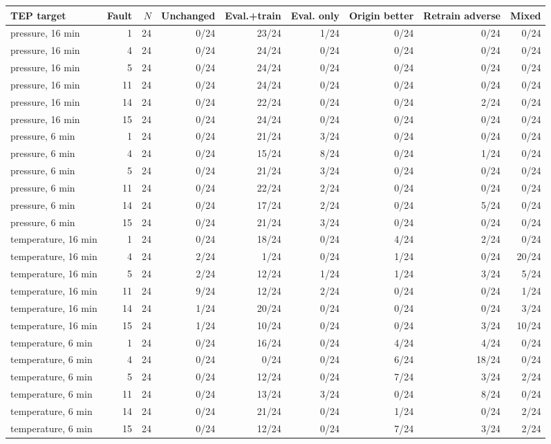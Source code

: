 \begin{tabular}{@{}lrrrrrrrr@{}}
\toprule
TEP target & Fault & $N$ & Unchanged & Eval.+train & Eval. only & Origin better & Retrain adverse & Mixed \\
\midrule
pressure, 16 min & 1 & 24 & 0/24 & 23/24 & 1/24 & 0/24 & 0/24 & 0/24 \\
pressure, 16 min & 4 & 24 & 0/24 & 24/24 & 0/24 & 0/24 & 0/24 & 0/24 \\
pressure, 16 min & 5 & 24 & 0/24 & 24/24 & 0/24 & 0/24 & 0/24 & 0/24 \\
pressure, 16 min & 11 & 24 & 0/24 & 24/24 & 0/24 & 0/24 & 0/24 & 0/24 \\
pressure, 16 min & 14 & 24 & 0/24 & 22/24 & 0/24 & 0/24 & 2/24 & 0/24 \\
pressure, 16 min & 15 & 24 & 0/24 & 24/24 & 0/24 & 0/24 & 0/24 & 0/24 \\
pressure, 6 min & 1 & 24 & 0/24 & 21/24 & 3/24 & 0/24 & 0/24 & 0/24 \\
pressure, 6 min & 4 & 24 & 0/24 & 15/24 & 8/24 & 0/24 & 1/24 & 0/24 \\
pressure, 6 min & 5 & 24 & 0/24 & 21/24 & 3/24 & 0/24 & 0/24 & 0/24 \\
pressure, 6 min & 11 & 24 & 0/24 & 22/24 & 2/24 & 0/24 & 0/24 & 0/24 \\
pressure, 6 min & 14 & 24 & 0/24 & 17/24 & 2/24 & 0/24 & 5/24 & 0/24 \\
pressure, 6 min & 15 & 24 & 0/24 & 21/24 & 3/24 & 0/24 & 0/24 & 0/24 \\
temperature, 16 min & 1 & 24 & 0/24 & 18/24 & 0/24 & 4/24 & 2/24 & 0/24 \\
temperature, 16 min & 4 & 24 & 2/24 & 1/24 & 0/24 & 1/24 & 0/24 & 20/24 \\
temperature, 16 min & 5 & 24 & 2/24 & 12/24 & 1/24 & 1/24 & 3/24 & 5/24 \\
temperature, 16 min & 11 & 24 & 9/24 & 12/24 & 2/24 & 0/24 & 0/24 & 1/24 \\
temperature, 16 min & 14 & 24 & 1/24 & 20/24 & 0/24 & 0/24 & 0/24 & 3/24 \\
temperature, 16 min & 15 & 24 & 1/24 & 10/24 & 0/24 & 0/24 & 3/24 & 10/24 \\
temperature, 6 min & 1 & 24 & 0/24 & 16/24 & 0/24 & 4/24 & 4/24 & 0/24 \\
temperature, 6 min & 4 & 24 & 0/24 & 0/24 & 0/24 & 6/24 & 18/24 & 0/24 \\
temperature, 6 min & 5 & 24 & 0/24 & 12/24 & 0/24 & 7/24 & 3/24 & 2/24 \\
temperature, 6 min & 11 & 24 & 0/24 & 13/24 & 3/24 & 0/24 & 8/24 & 0/24 \\
temperature, 6 min & 14 & 24 & 0/24 & 21/24 & 0/24 & 1/24 & 0/24 & 2/24 \\
temperature, 6 min & 15 & 24 & 0/24 & 12/24 & 0/24 & 7/24 & 3/24 & 2/24 \\
\bottomrule
\end{tabular}
